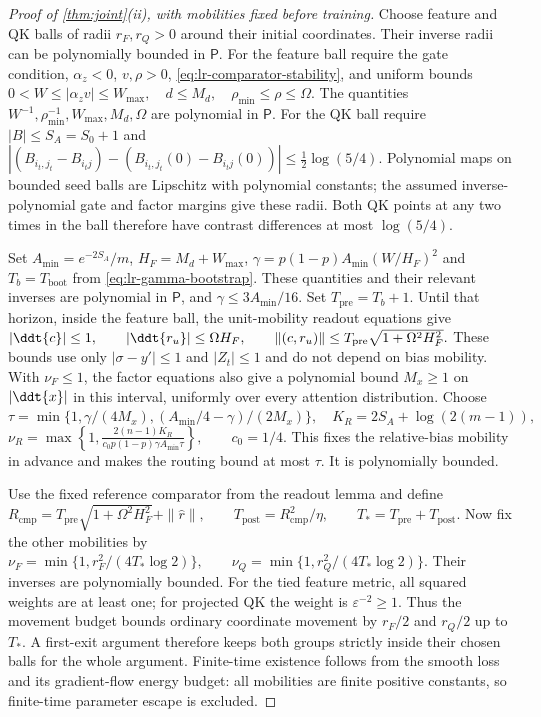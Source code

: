 \begin{proof}[Proof of \cref{thm:joint}(ii), with mobilities fixed before training]
Choose feature and QK balls of radii $r_F,r_Q>0$ around their initial
coordinates. Their inverse radii can be polynomially bounded in $\mathsf P$.
For the feature ball require the gate condition, $\alpha_z<0$, $v,\rho>0$,
\eqref{eq:lr-comparator-stability}, and uniform bounds
 $0<W\le|{\alpha_z v}|\le W_{\max},\quad d\le M_d,\quad \rho_{\min}\le\rho\le\Omega.$ 
The quantities $W^{-1},\rho_{\min}^{-1},W_{\max},M_d,\Omega$ are
polynomial in $\mathsf P$. For the QK ball require $|B|\le S_A=S_0+1$ and
 $|(B_{i_t,j_t}-B_{i_tj})-(B_{i_t,j_t}(0)-B_{i_tj}(0))| \le\tfrac12\log(5/4).$ 
Polynomial maps on bounded seed balls are Lipschitz with polynomial
constants; the assumed inverse-polynomial gate and factor margins give
these radii. Both QK points at any two times in the ball therefore have
contrast differences at most $\log(5/4)$.

Set $A_{\min}=e^{-2S_A}/m$, $H_F=M_d+W_{\max}$,
$\gamma=p(1-p) A_{\min}(W/H_F)^2$ and $T_b=T_{\mathrm{boot}}$ from
\eqref{eq:lr-gamma-bootstrap}. These quantities and their relevant
inverses are polynomial in $\mathsf P$, and $\gamma\le3A_{\min}/16$.
Set $T_{\mathrm{pre}}=T_b+1$. Until that horizon, inside the feature
ball, the unit-mobility readout equations give
 $|\ddt{c}|\le1,\qquad |\ddt{r_u}|\le\Omega H_F, \qquad \|(c,r_u)\|\le T_{\mathrm{pre}}\sqrt{1+\Omega^2H_F^2}.$ 
These bounds use only $|\sigma-y'|\le1$ and $|Z_t|\le1$ and do not
depend on bias mobility. With $\nu_F\le1$, the factor equations also
give a polynomial bound $M_x\ge1$ on $|\ddt{x}|$ in this interval,
uniformly over every attention distribution. Choose
 $\tau=\min\{1,\gamma/(4M_x),(A_{\min}/4-\gamma)/(2M_x)\}, \quad K_R=2S_A+\log(2(m-1)),$ 
 $\nu_R=\max\left\{1, \frac{2(n-1)K_R}{c_0p(1-p)\gamma A_{\min}\tau}\right\}, \qquad c_0=1/4.$ 
This fixes the relative-bias mobility in advance and makes the routing
bound at most $\tau$. It is polynomially bounded.

Use the fixed reference comparator from the readout lemma and define
 $R_{\mathrm{cmp}}=T_{\mathrm{pre}}\sqrt{1+\Omega^2H_F^2}+\|\widehat r\|, \qquad T_{\mathrm{post}}=R_{\mathrm{cmp}}^2/\eta,\qquad T_*=T_{\mathrm{pre}}+T_{\mathrm{post}}.$ 
Now fix the other mobilities by
 $\nu_F=\min\{1,r_F^2/(4T_*\log2)\},\qquad \nu_Q=\min\{1,r_Q^2/(4T_*\log2)\}.$ 
Their inverses are polynomially bounded. For the tied feature metric,
all squared weights are at least one; for projected QK the weight is
$\varepsilon^{-2}\ge1$. Thus the movement budget bounds ordinary
coordinate movement by $r_F/2$ and $r_Q/2$ up to $T_*$.
A first-exit argument therefore keeps both groups strictly inside their
chosen balls for the whole argument. Finite-time existence follows from
the smooth loss and its gradient-flow energy budget: all mobilities are
finite positive constants, so finite-time parameter escape is excluded.


\end{proof}
